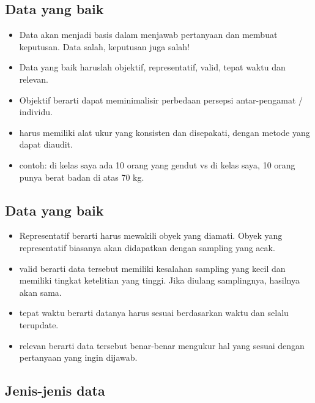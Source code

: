 \documentclass[
  letterpaper,
  DIV=11,
  numbers=noendperiod]{scrartcl}
\begin{document}
\hypertarget{data-yang-baik}{%
\subsection{Data yang baik}\label{data-yang-baik}}

\begin{itemize}
\item
  Data akan menjadi basis dalam menjawab pertanyaan dan membuat
  keputusan. Data salah, keputusan juga salah!
\item
  Data yang baik haruslah objektif, representatif, valid, tepat waktu
  dan relevan.
\item
  Objektif berarti dapat meminimalisir perbedaan persepsi antar-pengamat
  / individu.
\item
  harus memiliki alat ukur yang konsisten dan disepakati, dengan metode
  yang dapat diaudit.
\item
  contoh: di kelas saya ada 10 orang yang gendut vs di kelas saya, 10
  orang punya berat badan di atas 70 kg.
\end{itemize}

\hypertarget{data-yang-baik-1}{%
\subsection{Data yang baik}\label{data-yang-baik-1}}

\begin{itemize}
\item
  Representatif berarti harus mewakili obyek yang diamati. Obyek yang
  representatif biasanya akan didapatkan dengan sampling yang acak.
\item
  valid berarti data tersebut memiliki kesalahan sampling yang kecil dan
  memiliki tingkat ketelitian yang tinggi. Jika diulang samplingnya,
  hasilnya akan sama.
\item
  tepat waktu berarti datanya harus sesuai berdasarkan waktu dan selalu
  terupdate.
\item
  relevan berarti data tersebut benar-benar mengukur hal yang sesuai
  dengan pertanyaan yang ingin dijawab.
\end{itemize}

\hypertarget{jenis-jenis-data}{%
\subsection{Jenis-jenis data}\label{jenis-jenis-data}}
\end{document}
